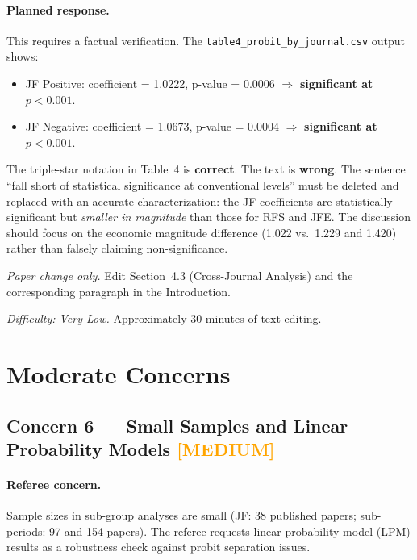 \documentclass[12pt]{article}
\newcommand{\MED}{\textcolor{orange}{\textbf{[MEDIUM]}}}
\begin{document}
\paragraph{Planned response.}

This requires a factual verification.  The \texttt{table4\_probit\_by\_journal.csv}
output shows:
\begin{itemize}
  \item JF Positive: coefficient = 1.0222, p-value = 0.0006 $\Rightarrow$
        \textbf{significant at $p < 0.001$}.
  \item JF Negative: coefficient = 1.0673, p-value = 0.0004 $\Rightarrow$
        \textbf{significant at $p < 0.001$}.
\end{itemize}

The triple-star notation in Table~4 is \textbf{correct}.  The text is
\textbf{wrong}.  The sentence ``fall short of statistical significance at
conventional levels'' must be deleted and replaced with an accurate
characterization: the JF coefficients are statistically significant but
\textit{smaller in magnitude} than those for RFS and JFE.  The discussion
should focus on the economic magnitude difference (1.022 vs.\ 1.229 and
1.420) rather than falsely claiming non-significance.

\textit{Paper change only.}  Edit Section~4.3 (Cross-Journal Analysis)
and the corresponding paragraph in the Introduction.

\textit{Difficulty: Very Low.}  Approximately 30 minutes of text editing.

\section{Moderate Concerns}

\subsection{Concern 6 --- Small Samples and Linear Probability Models \MED}

\paragraph{Referee concern.}
Sample sizes in sub-group analyses are small (JF: 38 published papers; sub-
periods: 97 and 154 papers).  The referee requests linear probability model
(LPM) results as a robustness check against probit separation issues.
\end{document}
